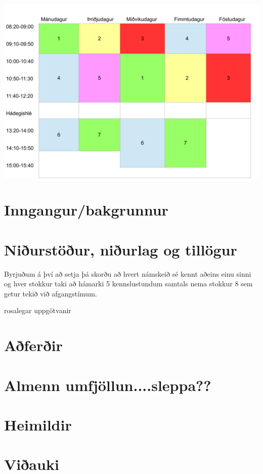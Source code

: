 \documentclass[a4paper,12pt]{article}
\begin{document}
\begin{center}
\includegraphics[scale=0.3]{stundatafla}
\end{center}


\section{Inngangur/bakgrunnur}



\section{Niðurstöður, niðurlag og tillögur}
Byrjuðum á því að setja þá skorðu að hvert námskeið sé kennt aðeins einu sinni og hver stokkur taki að hámarki 5 kennslustundum samtals nema stokkur 8 sem getur tekið við afgangstímum.


rosalegar uppgötvanir

\section{Aðferðir}

\section{Almenn umfjöllun....sleppa??}


\section{Heimildir}



\pagebreak
\section{Viðauki}
\end{document}

